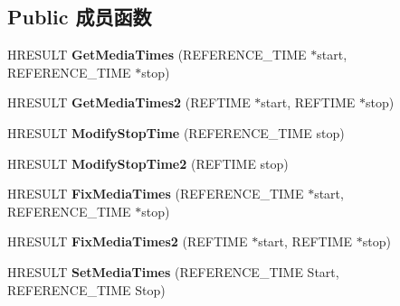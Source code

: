 \subsection*{Public 成员函数}
\begin{DoxyCompactItemize}
\item 
\mbox{\label{interface_i_a_m_timeline_src_a891c1430cd9673e4422ec955bb10bc51}} 
H\+R\+E\+S\+U\+LT {\bfseries Get\+Media\+Times} (R\+E\+F\+E\+R\+E\+N\+C\+E\+\_\+\+T\+I\+ME $\ast$start, R\+E\+F\+E\+R\+E\+N\+C\+E\+\_\+\+T\+I\+ME $\ast$stop)
\item 
\mbox{\label{interface_i_a_m_timeline_src_ad243af900d1c99bb1ddec924e494a099}} 
H\+R\+E\+S\+U\+LT {\bfseries Get\+Media\+Times2} (R\+E\+F\+T\+I\+ME $\ast$start, R\+E\+F\+T\+I\+ME $\ast$stop)
\item 
\mbox{\label{interface_i_a_m_timeline_src_acc8fc840c557d6033e10e1dc19f02bdf}} 
H\+R\+E\+S\+U\+LT {\bfseries Modify\+Stop\+Time} (R\+E\+F\+E\+R\+E\+N\+C\+E\+\_\+\+T\+I\+ME stop)
\item 
\mbox{\label{interface_i_a_m_timeline_src_a9b530b25e79ad04e621dc394c65210f7}} 
H\+R\+E\+S\+U\+LT {\bfseries Modify\+Stop\+Time2} (R\+E\+F\+T\+I\+ME stop)
\item 
\mbox{\label{interface_i_a_m_timeline_src_abb64ab482b8438cf31cd6103b17e094e}} 
H\+R\+E\+S\+U\+LT {\bfseries Fix\+Media\+Times} (R\+E\+F\+E\+R\+E\+N\+C\+E\+\_\+\+T\+I\+ME $\ast$start, R\+E\+F\+E\+R\+E\+N\+C\+E\+\_\+\+T\+I\+ME $\ast$stop)
\item 
\mbox{\label{interface_i_a_m_timeline_src_a5a457fd36c266e5105d4f090fb622392}} 
H\+R\+E\+S\+U\+LT {\bfseries Fix\+Media\+Times2} (R\+E\+F\+T\+I\+ME $\ast$start, R\+E\+F\+T\+I\+ME $\ast$stop)
\item 
\mbox{\label{interface_i_a_m_timeline_src_a2530c86c021bc2b1336f70de55249fd1}} 
H\+R\+E\+S\+U\+LT {\bfseries Set\+Media\+Times} (R\+E\+F\+E\+R\+E\+N\+C\+E\+\_\+\+T\+I\+ME Start, R\+E\+F\+E\+R\+E\+N\+C\+E\+\_\+\+T\+I\+ME Stop)
\item 
\mbox{\label{interface_i_a_m_timeline_src_a160eac33d71c66857cb016d89d168551}} 

\end{DoxyCompactItemize}
